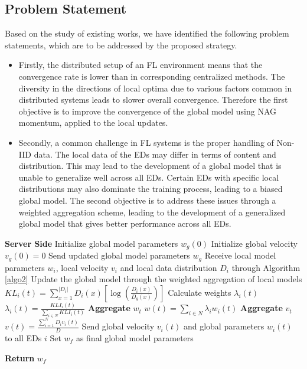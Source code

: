 \documentclass[journal]{IEEEtran}
\begin{document}
\subsection{Problem Statement}
Based on the study of existing works, we have identified the following problem statements, which are to be addressed by the proposed strategy.
\begin{itemize}
    \item Firstly, the distributed setup of an FL environment means that the convergence rate is lower than in corresponding centralized methods. The diversity in the directions of local optima due to various factors common in distributed systems leads to slower overall convergence. Therefore the first objective is to improve the convergence of the global model using NAG momentum, applied to the local updates.
    \item Secondly, a common challenge in FL systems is the proper handling of Non-IID data. The local data of the EDs may differ in terms of content and distribution. This may lead to the development of a global model that is unable to generalize well across all EDs. Certain EDs with specific local distributions may also dominate the training process, leading to a biased global model. The second objective is to address these issues through a weighted aggregation scheme, leading to the development of a generalized global model that gives better performance across all EDs. 
\end{itemize}

\begin{algorithm}[!t]
  \textbf{Server Side}\; 
Initialize global model parameters $w_g(0)$\;
Initialize global velocity $v_g(0) = 0$\;
{
    {
        {
            Send updated global model parameters $w_g$
        }
        {
            Receive local model parameters $w_i$, local velocity $v_i$ and local data distribution $D_i$ through Algorithm \ref{algo2}
        }
        Update the global model through the weighted aggregation of local models\;
        {
            \(
KL_i(t) = \sum_{x=1}^{|D_i|} D_i(x) \left[\log\left(\frac{D_i(x)}{D_g(x)}\right)\right]
\)\;
            Calculate weights $\lambda_i(t)$\;
            \(\lambda_i(t) = \frac{KLI_i(t)}{\sum_{i \in N} KLI_i(t)}\)\;
        }
        \textbf{Aggregate} $w_t$\;
        \(w(t) = \sum_{i \in N} \lambda_i w_i(t)\)\;
        \textbf{Aggregate} $v_t$\;
        \(v(t) = \frac{\sum_{i=1}^{N} D_i v_i(t)}{D}\)\;
        Send global velocity $v_i(t)$ and global parameters $w_i(t)$ to all EDs $i$\;
    }
}
Set $w_f$ as final global model parameters\;

\textbf{Return} $w_f$
\caption{FedWAN - Server Side}
\label{algo1}
\end{algorithm}
\end{document}
